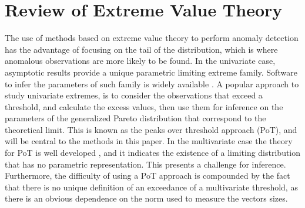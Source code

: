     \section{Review of Extreme Value Theory\label{sec:evt}}

The use of methods based on extreme value theory to perform anomaly detection
    has the advantage of focusing on the tail of the distribution, which is where
    anomalous observations are more likely to be found. In the univariate case,
    asymptotic results provide a unique parametric limiting extreme family. Software 
    to infer the parameters of such family is widely available  \cite[see, 
    for example,][]{coles2001}. A popular approach to study univariate 
    extremes, is to consider the observations  that exceed a threshold, and 
    calculate the excess values, then use them for inference on the parameters of 
    the generalized Pareto distribution that correspond to the theoretical limit. 
    This is known as  the peaks over threshold approach (PoT), and will be central 
    to the methods in this paper. In the multivariate case the theory for PoT is well 
    developed \citep[see, for example][]{dehaan2006}, and it indicates the existence 
    of a limiting  distribution  that has no parametric representation. This presents
    a challenge for inference. Furthermore, the difficulty of using a  PoT approach 
    is compounded by the fact  that there is no unique definition of an  
    exceedance of a multivariate threshold, as there is an obvious dependence on the norm 
    used to measure the vectors sizes.

